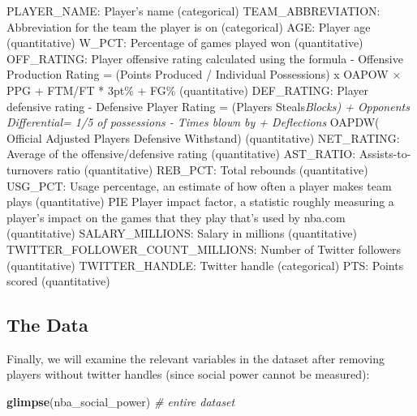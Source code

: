 \documentclass[]{article}
\newenvironment{Shaded}{\begin{snugshade}}{\end{snugshade}}
\newcommand{\CommentTok}[1]{\textcolor[rgb]{0.56,0.35,0.01}{\textit{#1}}}
\newcommand{\KeywordTok}[1]{\textcolor[rgb]{0.13,0.29,0.53}{\textbf{#1}}}
\newcommand{\NormalTok}[1]{#1}
\begin{document}
PLAYER\_NAME: Player's name (categorical) TEAM\_ABBREVIATION:
Abbreviation for the team the player is on (categorical) AGE: Player age
(quantitative) W\_PCT: Percentage of games played won (quantitative)
OFF\_RATING: Player offensive rating calculated using the formula -
Offensive Production Rating = (Points Produced / Individual Possessions)
x OAPOW × PPG + FTM/FT * 3pt\% + FG\% (quantitative) DEF\_RATING: Player
defensive rating - Defensive Player Rating = (Players
Steals\emph{Blocks) + Opponents Differential= 1/5 of possessions - Times
blown by + Deflections } OAPDW( Official Adjusted Players Defensive
Withstand) (quantitative) NET\_RATING: Average of the
offensive/defensive rating (quantitative) AST\_RATIO:
Assists-to-turnovers ratio (quantitative) REB\_PCT: Total rebounds
(quantitative) USG\_PCT: Usage percentage, an estimate of how often a
player makes team plays (quantitative) PIE Player impact factor, a
statistic roughly measuring a player's impact on the games that they
play that's used by nba.com (quantitative) SALARY\_MILLIONS: Salary in
millions (quantitative) TWITTER\_FOLLOWER\_COUNT\_MILLIONS: Number of
Twitter followers (quantitative) TWITTER\_HANDLE: Twitter handle
(categorical) PTS: Points scored (quantitative)

\hypertarget{the-data}{%
\subsection{The Data}\label{the-data}}

Finally, we will examine the relevant variables in the dataset after
removing players without twitter handles (since social power cannot be
measured):

\begin{Shaded}
\begin{Highlighting}[]
\KeywordTok{glimpse}\NormalTok{(nba_social_power) }\CommentTok{# entire dataset}
\end{Highlighting}
\end{Shaded}
\end{document}
